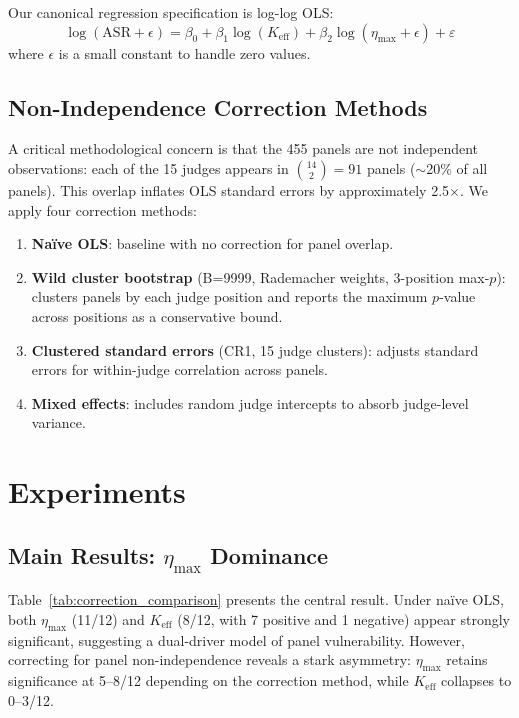 \documentclass[11pt,a4paper]{article}
\newcommand{\etamax}{\ensuremath{\eta_{\max}}}
\newcommand{\keff}{\ensuremath{K_{\text{eff}}}}
\begin{document}
Our canonical regression specification is log-log OLS:
\begin{equation}
\log(\text{ASR} + \epsilon) = \beta_0 + \beta_1 \log(\keff) + \beta_2 \log(\etamax + \epsilon) + \varepsilon
\label{eq:regression}
\end{equation}
where $\epsilon$ is a small constant to handle zero values.

\subsection{Non-Independence Correction Methods}
\label{sec:correction}

A critical methodological concern is that the 455 panels are not independent observations: each of the 15 judges appears in $\binom{14}{2}=91$ panels ($\sim$20\% of all panels).
This overlap inflates OLS standard errors by approximately 2.5$\times$.
We apply four correction methods:

\begin{enumerate}
\item \textbf{Na\"ive OLS}: baseline with no correction for panel overlap.
\item \textbf{Wild cluster bootstrap} (B=9999, Rademacher weights, 3-position max-$p$): clusters panels by each judge position and reports the maximum $p$-value across positions as a conservative bound.
\item \textbf{Clustered standard errors} (CR1, 15 judge clusters): adjusts standard errors for within-judge correlation across panels.
\item \textbf{Mixed effects}: includes random judge intercepts to absorb judge-level variance.
\end{enumerate}

\section{Experiments}
\label{sec:experiments}

\subsection{Main Results: $\etamax$ Dominance}
\label{sec:main_results}

Table~\ref{tab:correction_comparison} presents the central result.
Under na\"ive OLS, both $\etamax$ (11/12) and $\keff$ (8/12, with 7 positive and 1 negative) appear strongly significant, suggesting a dual-driver model of panel vulnerability.
However, correcting for panel non-independence reveals a stark asymmetry: $\etamax$ retains significance at 5--8/12 depending on the correction method, while $\keff$ collapses to 0--3/12.
\end{document}
